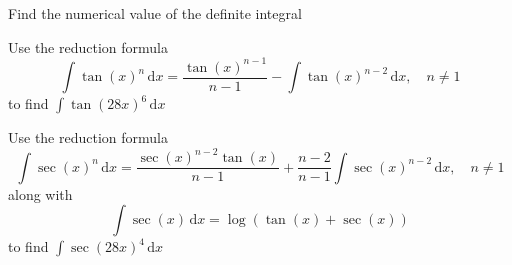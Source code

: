 \documentclass[12pt,fleqn]{exam}
\begin{document}
\begin{questions}

\question  Find the numerical value of the definite integral

\newpage

\question Use the reduction formula
\begin{equation}
 \int \tan(x)^n \, \mathrm{d} x = \frac{\tan(x)^{n-1}}{n-1}  - \int \tan(x)^{n-2} \, \mathrm{d} x, \quad n \neq 1
\end{equation}
to find $\displaystyle \int \tan(28 x)^6 \, \mathrm{d} x$
\begin{solution}%

\end{solution}

\newpage

\question Use the reduction formula
\begin{equation}
 \int \sec(x)^n \, \mathrm{d} x = \frac{\sec(x)^{n-2} \tan(x)}{n-1}  + \frac{n-2}{n-1} \int \sec(x)^{n-2} \, \mathrm{d} x, \quad n \neq 1
\end{equation}
along with
\begin{equation}
  \int \sec(x) \, \mathrm{d} x =  \log \left( \tan{(x)}+\sec{(x)}\right) 
\end{equation}
to find $\displaystyle  \int \sec(28 x)^4 \, \mathrm{d} x$


\end{questions}
%     
\end{document}
